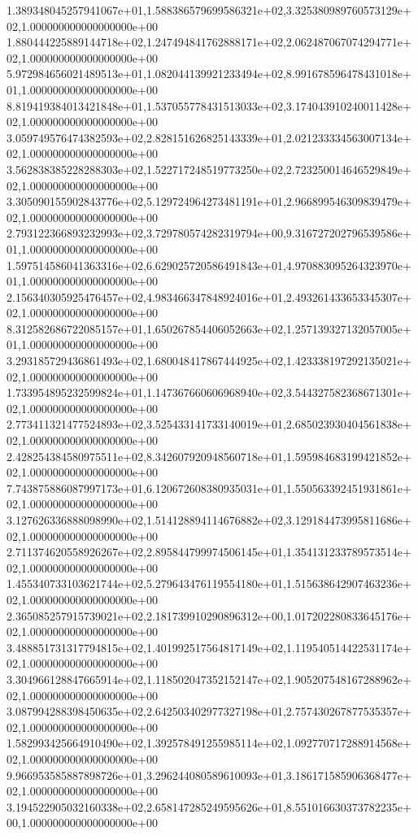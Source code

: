 1.389348045257941067e+01,1.588386579699586321e+02,3.325380989760573129e+02,1.000000000000000000e+00
1.880444225889144718e+02,1.247494841762888171e+02,2.062487067074294771e+02,1.000000000000000000e+00
5.972984656021489513e+01,1.082044139921233494e+02,8.991678596478431018e+01,1.000000000000000000e+00
8.819419384013421848e+01,1.537055778431513033e+02,3.174043910240011428e+02,1.000000000000000000e+00
3.059749576474382593e+02,2.828151626825143339e+01,2.021233334563007134e+02,1.000000000000000000e+00
3.562838385228288303e+02,1.522717248519773250e+02,2.723250014646529849e+02,1.000000000000000000e+00
3.305090155902843776e+02,5.129724964273481191e+01,2.966899546309839479e+02,1.000000000000000000e+00
2.793122366893232993e+02,3.729780574282319794e+00,9.316727202796539586e+01,1.000000000000000000e+00
1.597514586041363316e+02,6.629025720586491843e+01,4.970883095264323970e+01,1.000000000000000000e+00
2.156340305925476457e+02,4.983466347848924016e+01,2.493261433653345307e+02,1.000000000000000000e+00
8.312582686722085157e+01,1.650267854406052663e+02,1.257139327132057005e+01,1.000000000000000000e+00
3.293185729436861493e+02,1.680048417867444925e+02,1.423338197292135021e+02,1.000000000000000000e+00
1.733954895232599824e+01,1.147367660606968940e+02,3.544327582368671301e+02,1.000000000000000000e+00
2.773411321477524893e+02,3.525433141733140019e+01,2.685023930404561838e+02,1.000000000000000000e+00
2.428254384580975511e+02,8.342607920948560718e+01,1.595984683199421852e+02,1.000000000000000000e+00
7.743875886087997173e+01,6.120672608380935031e+01,1.550563392451931861e+02,1.000000000000000000e+00
3.127626336888098990e+02,1.514128894114676882e+02,3.129184473995811686e+02,1.000000000000000000e+00
2.711374620558926267e+02,2.895844799974506145e+01,1.354131233789573514e+02,1.000000000000000000e+00
1.455340733103621744e+02,5.279643476119554180e+01,1.515638642907463236e+02,1.000000000000000000e+00
2.365085257915739021e+02,2.181739910290896312e+00,1.017202280833645176e+02,1.000000000000000000e+00
3.488851731317794815e+02,1.401992517564817149e+02,1.119540514422531174e+02,1.000000000000000000e+00
3.304966128847665914e+02,1.118502047352152147e+02,1.905207548167288962e+02,1.000000000000000000e+00
3.087994288398450635e+02,2.642503402977327198e+01,2.757430267877535357e+02,1.000000000000000000e+00
1.582993425664910490e+02,1.392578491255985114e+02,1.092770717288914568e+02,1.000000000000000000e+00
9.966953585887898726e+01,3.296244080589610093e+01,3.186171585906368477e+02,1.000000000000000000e+00
3.194522905032160338e+02,2.658147285249595626e+01,8.551016630373782235e+00,1.000000000000000000e+00
